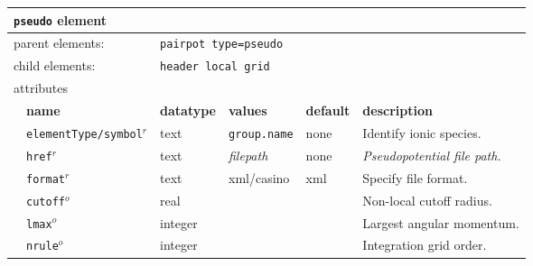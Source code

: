 \FloatBarrier
\begin{table}[h]
\begin{center}
\begin{tabularx}{\textwidth}{l l l l l l }
\hline
\multicolumn{6}{l}{\texttt{pseudo} element} \\
\hline
\multicolumn{2}{l}{parent elements:} & \multicolumn{4}{l}{\texttt{pairpot type=pseudo}}\\
\multicolumn{2}{l}{child  elements:} & \multicolumn{4}{l}{\texttt{header local grid}}\\
\multicolumn{2}{l}{attributes}  & \multicolumn{4}{l}{}\\
   &   \bfseries name     & \bfseries datatype & \bfseries values & \bfseries default   & \bfseries description \\
   & \texttt{elementType/symbol}$^r$&  text           &\texttt{group.name}& none               & Identify ionic species.         \\
   & \texttt{href}$^r$    &  text              & \textit{filepath}& none                & \textit{Pseudopotential file path.}\\
   & \texttt{format}$^r$  &  text              & xml/casino       & xml                 & Specify file format.\\
   & \texttt{cutoff}$^o$  &  real              &                  &                     & Non-local cutoff radius.  \\
   & \texttt{lmax}$^o$    &  integer           &                  &                     & Largest angular momentum.  \\
   & \texttt{nrule}$^o$   &  integer           &                  &                     & Integration grid order.             \\
  \hline
\end{tabularx}
\end{center}
\end{table}
\FloatBarrier




